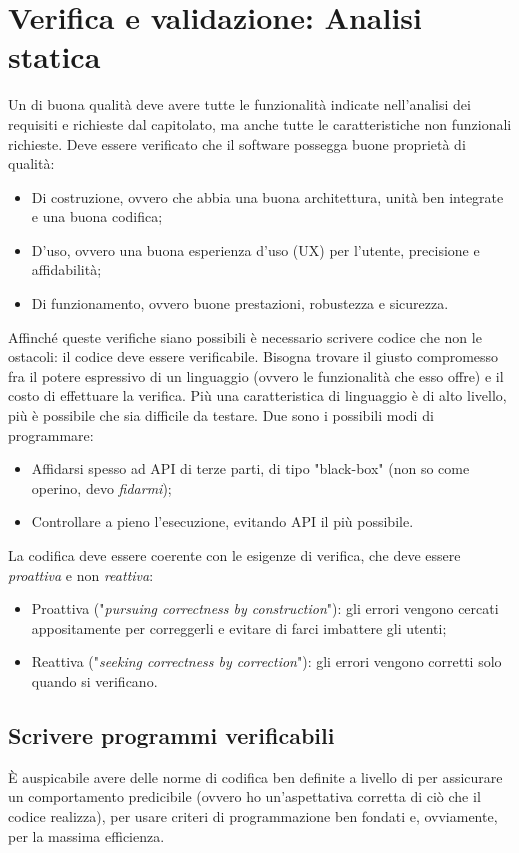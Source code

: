 \documentclass[../main]{subfiles}
\begin{document}
\section{Verifica e validazione: Analisi statica}
Un  di buona qualità deve avere tutte le funzionalità indicate nell'analisi dei requisiti e richieste dal capitolato, ma anche tutte le caratteristiche non funzionali richieste.\newline
Deve essere verificato che il software possegga buone proprietà di qualità:
\begin{itemize}
    \item Di costruzione, ovvero che abbia una buona architettura, unità ben integrate e una buona codifica;
    \item D'uso, ovvero una buona esperienza d'uso (UX) per l'utente, precisione e affidabilità;
    \item Di funzionamento, ovvero buone prestazioni, robustezza e sicurezza.
\end{itemize}
Affinché queste verifiche siano possibili è necessario scrivere codice che non le ostacoli: il codice deve essere verificabile. Bisogna trovare il giusto compromesso fra il potere espressivo di un linguaggio (ovvero le funzionalità che esso offre) e il costo di effettuare la verifica. Più una caratteristica di linguaggio è di alto livello, più è possibile che sia difficile da testare.\newline
Due sono i possibili modi di programmare:
\begin{itemize}
    \item Affidarsi spesso ad API di terze parti, di tipo "black-box" (non so come operino, devo \textit{fidarmi});
    \item Controllare a pieno l'esecuzione, evitando API il più possibile.
\end{itemize}
La codifica deve essere coerente con le esigenze di verifica, che deve essere \textit{proattiva} e non \textit{reattiva}:
\begin{itemize}
    \item Proattiva ("\textit{pursuing correctness by construction}"): gli errori vengono cercati appositamente per correggerli e evitare di farci imbattere gli utenti;
    \item Reattiva ("\textit{seeking correctness by correction}"): gli errori vengono corretti solo quando si verificano.
\end{itemize}
\subsection{Scrivere programmi verificabili}
È auspicabile avere delle norme di codifica ben definite a livello di  per assicurare un comportamento predicibile (ovvero ho un'aspettativa corretta di ciò che il codice realizza), per usare criteri di programmazione ben fondati e, ovviamente, per la massima efficienza.
\end{document}

